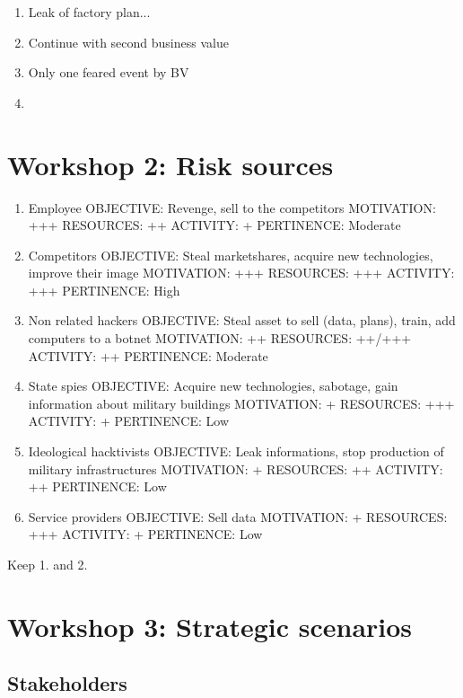 \begin{enumerate}
\tightlist
\item
  Leak of factory plan...
\item
  Continue with second business value
\item
  Only one feared event by BV
\item
\end{enumerate}

\hypertarget{Workshopux202:ux20Riskux20sources}{%
\section{Workshop 2: Risk
sources}\label{Workshopux202:ux20Riskux20sources}}

\begin{enumerate}
\tightlist
\item
  Employee OBJECTIVE: Revenge, sell to the competitors MOTIVATION: +++
  RESOURCES: ++ ACTIVITY: + PERTINENCE: Moderate
\item
  Competitors OBJECTIVE: Steal marketshares, acquire new technologies,
  improve their image MOTIVATION: +++ RESOURCES: +++ ACTIVITY: +++
  PERTINENCE: High
\item
  Non related hackers OBJECTIVE: Steal asset to sell (data, plans),
  train, add computers to a botnet MOTIVATION: ++ RESOURCES: ++/+++
  ACTIVITY: ++ PERTINENCE: Moderate
\item
  State spies OBJECTIVE: Acquire new technologies, sabotage, gain
  information about military buildings MOTIVATION: + RESOURCES: +++
  ACTIVITY: + PERTINENCE: Low
\item
  Ideological hacktivists OBJECTIVE: Leak informations, stop production
  of military infrastructures MOTIVATION: + RESOURCES: ++ ACTIVITY: ++
  PERTINENCE: Low
\item
  Service providers OBJECTIVE: Sell data MOTIVATION: + RESOURCES: +++
  ACTIVITY: + PERTINENCE: Low
\end{enumerate}

Keep 1. and 2.

\hypertarget{Workshopux203:ux20Strategicux20scenarios}{%
\section{Workshop 3: Strategic
scenarios}\label{Workshopux203:ux20Strategicux20scenarios}}

\hypertarget{Stakeholders}{%
\subsection{Stakeholders}\label{Stakeholders}}

